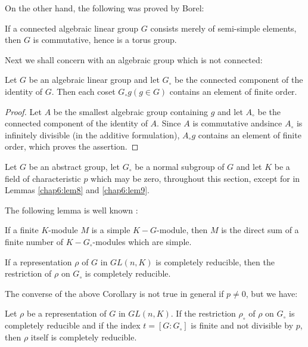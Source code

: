 On the other hand, the following was proved by Borel:
	
\begin{lem}\label{chap6:lem3}%
  If a connected algebraic linear group $G$ consists merely of
  semi-simple elements, then $G$ is commutative, hence is a torus
  group. 
\end{lem}

Next we shall concern with an algebraic group which is not connected: 
	
\begin{lem}\label{chap6:lem4}%
  Let $G$ be an algebraic linear group and let $G_{\circ}$ be the
  connected component of the identity of $G$.  Then each coset
  $G_{\circ}g(g \in G)$ contains an element of finite order. 
\end{lem}
 
\begin{proof}
  Let  $A$ be the smallest algebraic group containing $g$ and let
  $A_{\circ}$ be the connected component of the identity of $A$.
  Since $A$ is commutative and\pageoriginale since $A_{\circ}$ is
  infinitely  divisible (in the additive formulation), $A_{\circ} g$
  contains an  element of finite order, which proves the assertion.  
\end{proof}
 
\medskip
{} 

Let $G$ be an abstract group, let $G_{\circ}$ be a normal subgroup of
$G$ and let $K$ be a field of characteristic $p$ which may be zero,
throughout this section, except for in Lemmas \ref{chap6:lem8} and
\ref{chap6:lem9}.  
	
The following lemma is well known :

\begin{lem}\label{chap6:lem5}%
  If a finite $K$-module $M$ is a simple $K-G$-module, then $M$ is the
  direct sum of a finite number of $K-G_{\circ}$-modules which are
  simple. 
\end{lem}
 
\begin{coro*}
  If a representation $\rho$ of $G$ in $GL (n, K)$ is completely
  reducible, then the restriction of $\rho$ on $G_{\circ}$ is
  completely reducible.   
\end{coro*} 

The converse of the above Corollary is not true in general if $p \neq
0$, but we have: 
	
\begin{lem}\label{chap6:lem6} %
  Let $\rho$ be a representation of $G$ in $GL(n, K)$.  If the
  restriction $\rho_{\circ}$ of $\rho$ on $G_{\circ}$ is completely
  reducible and if the index $t=[G:G_{\circ}]$ is finite and not
  divisible by $p$, then $\rho$ itself is completely reducible. 
\end{lem}

